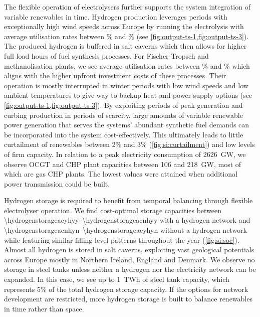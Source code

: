 The flexible operation of electrolysers further supports the system integration
of variable renewables in time. Hydrogen production leverages periods with
exceptionally high wind speeds across Europe by running the electrolysis with
average utilisation rates between \mincfelectrolysis\% and \maxcfelectrolysis\%
(see \cref{fig:output-ts-1,fig:output-ts-3}). The produced hydrogen is buffered
in salt caverns which then allows for higher full load hours of fuel synthesis
processes. For Fischer-Tropsch and methanolisation plants, we see average
utilisation rates between \mincfFT\% and \maxcfFT\% which aligns with the higher
upfront investment costs of these processes. Their operation is mostly
interrupted in winter periods with low wind speeds and low ambient temperatures
to give way to backup heat and power supply options (see
\cref{fig:output-ts-1,fig:output-ts-3}). By exploiting periods of peak
generation and curbing production in periods of scarcity, large amounts of
variable renewable power generation that serves the systems' abundant synthetic
fuel demands can be incorporated into the system cost-effectively. This
ultimately leads to little curtailment of renewables between 2\% and 3\%
(\cref{fig:si:curtailment}) and low levels of firm capacity. In relation to a
peak electricity consumption of 2626~GW\el, we observe OCGT and CHP plant
capacities between 106 and 218~GW\el, most of which are gas CHP plants. The
lowest values were attained when additional power transmission could be built.

Hydrogen storage is required to benefit from temporal balancing through flexible
electrolyser operation. We find cost-optimal storage capacities between
\SIrange{\hydrogenstorageacyhyy}{\hydrogenstorageacnhyy}{\twh} with a hydrogen
network and \SIrange{\hydrogenstorageacnhyn}{\hydrogenstorageacyhyn}{\twh}
without a hydrogen network while featuring similar filling level patterns
throughout the year (\cref{fig:si:soc}). Almost all hydrogen is stored in salt
caverns, exploiting vast geological potentials across Europe mostly in Northern
Ireland, England and Denmark. We observe no storage in steel tanks unless
neither a hydrogen nor the electricity network can be expanded. In this case, we
see up to 1~TWh of steel tank capacity, which represents 5\% of the total
hydrogen storage capacity. If the options for network development are
restricted, more hydrogen storage is built to balance renewables in time rather
than space.

